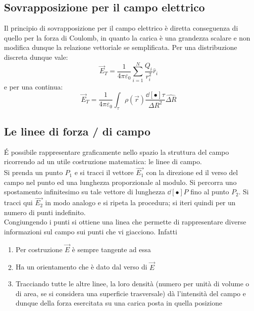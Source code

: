 \subsection{Sovrapposizione per il campo elettrico}
Il principio di sovrapposizione per il campo elettrico è diretta conseguenza di quello per la forza di Coulomb, in quanto la carica è una grandezza scalare e non modifica dunque la relazione vettoriale se semplificata. Per una distribuzione discreta dunque vale:
\[\vec{E}_T = \frac{1}{4 \pi \varepsilon_0} \sum\limits_{i=1}^{N} \frac{Q_i}{r_i^2}\hat{r}_i\]
e per una continua:
\[\vec{E}_T = \frac{1}{4 \pi \varepsilon_0} \int_\tau \rho(\vec{r}) \frac{\dd[•]{\tau}}{\Delta R^2} \hat{\Delta R}\]

\subsection{Le linee di forza / di campo}
\'E possibile rappresentare graficamente nello spazio la struttura del campo ricorrendo ad un utile costruzione matematica: le linee di campo. 
\\Si prenda un punto $P_1$ e si tracci il vettore $\vec{E_1}$ con la direzione ed il verso del campo nel punto ed una lunghezza proporzionale al modulo. Si percorra uno spostamento infinitesimo su tale vettore di lunghezza $\dd[•]{P}$ fino al punto $P_2$. Si tracci qui $\vec{E_2}$ in modo analogo e si ripeta la procedura; si iteri quindi per un numero di punti indefinito.
\\Congiungendo i punti si ottiene una linea che permette di rappresentare diverse informazioni sul campo sui punti che vi giacciono. Infatti
\begin{enumerate}
\item Per costruzione $\vec{E}$ è sempre tangente ad essa
\item Ha un orientamento che è dato dal verso di $\vec{E}$
\item Tracciando tutte le altre linee, la loro densità (numero per unità di volume o di area, se si considera una superficie trasversale) dà l'intensità del campo e dunque della forza esercitata su una carica posta in quella posizione
\end{enumerate}

